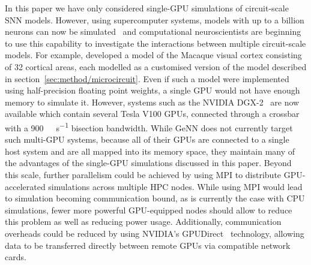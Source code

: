 \documentclass[utf8]{frontiersSCNS} %
\begin{document}
In this paper we have only considered single-GPU simulations of circuit-scale SNN models.
However, using supercomputer systems, models with up to a billion neurons can now be simulated~\citep{Jordan2018} and computational neuroscientists are beginning to use this capability to investigate the interactions between multiple circuit-scale models.
For example, \citet{Schmidt2015} developed a model of the Macaque visual cortex consisting of 32 cortical areas, each modelled as a customised version of the model described in section~\ref{sec:method/microcircuit}.
Even if such a model were implemented using half-precision floating point weights, a single GPU would not have enough memory to simulate it.
However, systems such as the NVIDIA DGX-2~\citep{NVIDIACorporation2018b} are now available which contain several Tesla V100 GPUs, connected through a crossbar with a \SI{900}{\giga\byte\per\second} bisection bandwidth.
While GeNN does not currently target such multi-GPU systems, because all of their GPUs are connected to a single host system and are all mapped into its memory space, they maintain many of the advantages of the single-GPU simulations discussed in this paper.
Beyond this scale, further parallelism could be achieved by using MPI to distribute GPU-accelerated simulations across multiple HPC nodes.
While using MPI would lead to simulation becoming communication bound, as is currently the case with CPU simulations, fewer more powerful GPU-equipped nodes should allow to reduce this problem as well as reducing power usage. 
Additionally, communication overheads could be reduced by using NVIDIA's GPUDirect~\citep{NVIDIACorporation2018c} technology, allowing data to be transferred directly between remote GPUs via compatible network cards.
\end{document}
